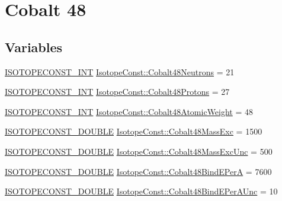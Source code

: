 \hypertarget{group___isotope_const-_cobalt-_co48}{}\section{Cobalt 48}
\label{group___isotope_const-_cobalt-_co48}
\subsection*{Variables}
\begin{DoxyCompactItemize}
\item 
\mbox{\hyperlink{group___isotope_const-_macros_ga5f18360b3e99483a35c32d789e62621c}{I\+S\+O\+T\+O\+P\+E\+C\+O\+N\+S\+T\+\_\+\+I\+NT}} \mbox{\hyperlink{group___isotope_const-_cobalt-_co48_ga766e4783f9ff125c3c312e0a770e935d}{Isotope\+Const\+::\+Cobalt48\+Neutrons}} = 21
\item 
\mbox{\hyperlink{group___isotope_const-_macros_ga5f18360b3e99483a35c32d789e62621c}{I\+S\+O\+T\+O\+P\+E\+C\+O\+N\+S\+T\+\_\+\+I\+NT}} \mbox{\hyperlink{group___isotope_const-_cobalt-_co48_ga21ccb58df1b57e67d8badedd37903a57}{Isotope\+Const\+::\+Cobalt48\+Protons}} = 27
\item 
\mbox{\hyperlink{group___isotope_const-_macros_ga5f18360b3e99483a35c32d789e62621c}{I\+S\+O\+T\+O\+P\+E\+C\+O\+N\+S\+T\+\_\+\+I\+NT}} \mbox{\hyperlink{group___isotope_const-_cobalt-_co48_ga79b5548a2466cb33f655ae0cd4038ed1}{Isotope\+Const\+::\+Cobalt48\+Atomic\+Weight}} = 48
\item 
\mbox{\hyperlink{group___isotope_const-_macros_ga8f45a7272ce02c0b4c65c44636ed719a}{I\+S\+O\+T\+O\+P\+E\+C\+O\+N\+S\+T\+\_\+\+D\+O\+U\+B\+LE}} \mbox{\hyperlink{group___isotope_const-_cobalt-_co48_ga537a142faa285ac28752f4d418c121f5}{Isotope\+Const\+::\+Cobalt48\+Mass\+Exc}} = 1500
\item 
\mbox{\hyperlink{group___isotope_const-_macros_ga8f45a7272ce02c0b4c65c44636ed719a}{I\+S\+O\+T\+O\+P\+E\+C\+O\+N\+S\+T\+\_\+\+D\+O\+U\+B\+LE}} \mbox{\hyperlink{group___isotope_const-_cobalt-_co48_ga48d94eac10186954de6e5946862d9301}{Isotope\+Const\+::\+Cobalt48\+Mass\+Exc\+Unc}} = 500
\item 
\mbox{\hyperlink{group___isotope_const-_macros_ga8f45a7272ce02c0b4c65c44636ed719a}{I\+S\+O\+T\+O\+P\+E\+C\+O\+N\+S\+T\+\_\+\+D\+O\+U\+B\+LE}} \mbox{\hyperlink{group___isotope_const-_cobalt-_co48_ga73bb8359e66c8ae08b770c2e7a017eee}{Isotope\+Const\+::\+Cobalt48\+Bind\+E\+PerA}} = 7600
\item 
\mbox{\hyperlink{group___isotope_const-_macros_ga8f45a7272ce02c0b4c65c44636ed719a}{I\+S\+O\+T\+O\+P\+E\+C\+O\+N\+S\+T\+\_\+\+D\+O\+U\+B\+LE}} \mbox{\hyperlink{group___isotope_const-_cobalt-_co48_ga953980243442b5cfb205230272490f8a}{Isotope\+Const\+::\+Cobalt48\+Bind\+E\+Per\+A\+Unc}} = 10

\end{DoxyCompactItemize}
